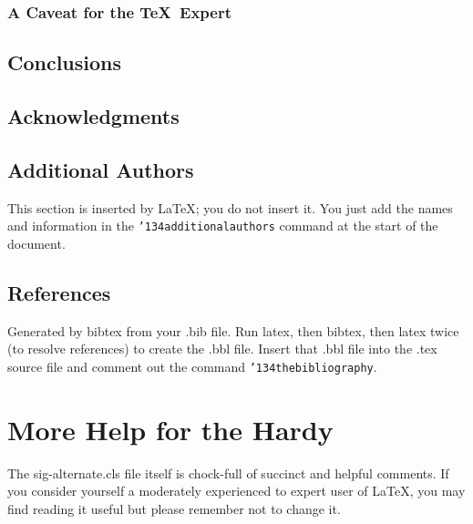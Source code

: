 \documentclass[twoside,letterpaper]{soups}
\begin{document}
\subsubsection*{A Caveat for the \TeX\ Expert}
\subsection{Conclusions}
\subsection{Acknowledgments}
\subsection{Additional Authors}
This section is inserted by \LaTeX; you do not insert it.
You just add the names and information in the
\texttt{{\char'134}additionalauthors} command at the start
of the document.
\subsection{References}
Generated by bibtex from your .bib file. Run latex,
then bibtex, then latex twice (to resolve references)
to create the .bbl file. Insert that .bbl file into
the .tex source file and comment out
the command \texttt{{\char'134}thebibliography}.
\section{More Help for the Hardy}
The sig-alternate.cls file itself is chock-full of succinct
and helpful comments. If you consider yourself a moderately
experienced to expert user of \LaTeX, you may find reading
it useful but please remember not to change it.
\end{document}
